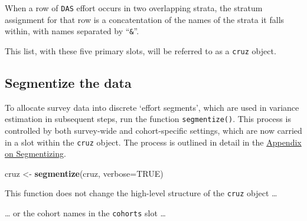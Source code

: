 \documentclass[
]{book}
\newenvironment{Shaded}{\begin{snugshade}}{\end{snugshade}}
\newcommand{\DataTypeTok}[1]{\textcolor[rgb]{0.13,0.29,0.53}{#1}}
\newcommand{\DecValTok}[1]{\textcolor[rgb]{0.00,0.00,0.81}{#1}}
\newcommand{\KeywordTok}[1]{\textcolor[rgb]{0.13,0.29,0.53}{\textbf{#1}}}
\newcommand{\NormalTok}[1]{#1}
\newcommand{\OperatorTok}[1]{\textcolor[rgb]{0.81,0.36,0.00}{\textbf{#1}}}
\newcommand{\OtherTok}[1]{\textcolor[rgb]{0.56,0.35,0.01}{#1}}
\newcommand{\StringTok}[1]{\textcolor[rgb]{0.31,0.60,0.02}{#1}}
\begin{document}
When a row of \texttt{DAS} effort occurs in two overlapping strata, the stratum assignment for that row is a concatentation of the names of the strata it falls within, with names separated by ``\texttt{\&}''.

This list, with these five primary slots, will be referred to as a \texttt{cruz} object.

\hypertarget{segmentize-the-data}{%
\subsection*{Segmentize the data}\label{segmentize-the-data}}

To allocate survey data into discrete `effort segments', which are used in variance estimation in subsequent steps, run the function \texttt{segmentize()}. This process is controlled by both survey-wide and cohort-specific \protect\hypertarget{settings}{}{settings}, which are now carried in a slot within the \texttt{cruz} object. The process is outlined in detail in the \protect\hyperlink{segmentizing}{Appendix on Segmentizing}.

\begin{Shaded}
\begin{Highlighting}[]
\NormalTok{cruz <-}\StringTok{ }\KeywordTok{segmentize}\NormalTok{(cruz, }\DataTypeTok{verbose=}\OtherTok{TRUE}\NormalTok{)}
\end{Highlighting}
\end{Shaded}

This function does not change the high-level structure of the \texttt{cruz} object \ldots{}

\begin{Shaded}
\end{Shaded}

\ldots{} or the cohort names in the \texttt{cohorts} slot \ldots{}

\begin{Shaded}
\end{Shaded}
\end{document}
